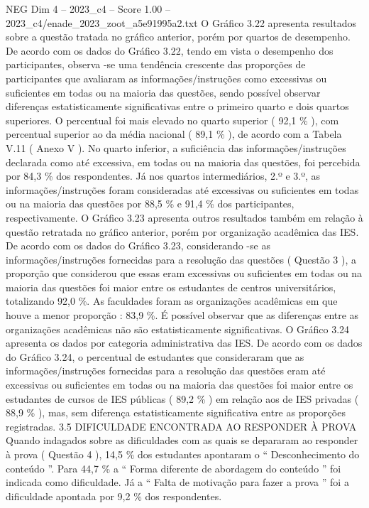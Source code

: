 \begin{textsample}{NEG Dim 4 – 2023\_c4 – Score 1.00 – 2023\_c4/enade\_2023\_zoot\_a5e91995a2.txt}
O Gráfico 3.22 apresenta resultados sobre a questão tratada no gráfico anterior, porém por quartos de desempenho.
De acordo com os dados do Gráfico 3.22, tendo em vista o desempenho dos participantes, observa -se uma tendência crescente das proporções de participantes que avaliaram as informações/instruções como excessivas ou suficientes em todas ou na maioria das questões, sendo possível observar diferenças estatisticamente significativas entre o primeiro quarto e dois quartos superiores.
O percentual foi mais elevado no quarto superior ( 92,1 \% ), com percentual superior ao da média nacional ( 89,1 \% ), de acordo com a Tabela V.11 ( Anexo V ).
No quarto inferior, a suficiência das informações/instruções declarada como até excessiva, em todas ou na maioria das questões, foi percebida por 84,3 \% dos respondentes.
Já nos quartos intermediários, 2.º e 3.º, as informações/instruções foram consideradas até excessivas ou suficientes em todas ou na maioria das questões por 88,5 \% e 91,4 \% dos participantes, respectivamente.
O Gráfico 3.23 apresenta outros resultados também em relação à questão retratada no gráfico anterior, porém por organização acadêmica das IES.
De acordo com os dados do Gráfico 3.23, considerando -se as informações/instruções fornecidas para a resolução das questões ( Questão 3 ), a proporção que considerou que essas eram excessivas ou suficientes em todas ou na maioria das questões foi maior entre os estudantes de centros universitários, totalizando 92,0 \%.
As faculdades foram as organizações acadêmicas em que houve a menor proporção : 83,9 \%.
É possível observar que as diferenças entre as organizações acadêmicas não são estatisticamente significativas.
O Gráfico 3.24 apresenta os dados por categoria administrativa das IES.
De acordo com os dados do Gráfico 3.24, o percentual de estudantes que consideraram que as informações/instruções fornecidas para a resolução das questões eram até excessivas ou suficientes em todas ou na maioria das questões foi maior entre os estudantes de cursos de IES públicas ( 89,2 \% ) em relação aos de IES privadas ( 88,9 \% ), mas, sem diferença estatisticamente significativa entre as proporções registradas. 3.5 DIFICULDADE ENCONTRADA AO RESPONDER À PROVA Quando indagados sobre as dificuldades com as quais se depararam ao responder à prova ( Questão 4 ), 14,5 \% dos estudantes apontaram o “ Desconhecimento do conteúdo ”.
Para 44,7 \% a “ Forma diferente de abordagem do conteúdo ” foi indicada como dificuldade.
Já a “ Falta de motivação para fazer a prova ” foi a dificuldade apontada por 9,2 \% dos respondentes.

\end{textsample}
